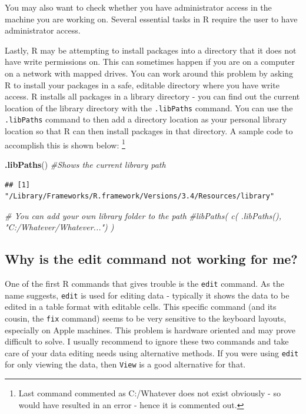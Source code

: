 \documentclass[]{krantz}
\makeatletter
\newenvironment{Shaded}{\begin{snugshade}}{\end{snugshade}}
\newcommand{\KeywordTok}[1]{\textcolor[rgb]{0.27,0.27,0.27}{\textbf{#1}}}
\newcommand{\CommentTok}[1]{\textcolor[rgb]{0.56,0.35,0.01}{\textit{#1}}}
\newcommand{\NormalTok}[1]{#1}
\newenvironment{kframe}{%
\medskip{}
\setlength{\fboxsep}{.8em}
 \def\at@end@of@kframe{}%
 \ifinner\ifhmode%
  \def\at@end@of@kframe{\end{minipage}}%
  \begin{minipage}{\columnwidth}%
 \fi\fi%
 \def\FrameCommand##1{\hskip\@totalleftmargin \hskip-\fboxsep
 \colorbox{shadecolor}{##1}\hskip-\fboxsep
     \hskip-\linewidth \hskip-\@totalleftmargin \hskip\columnwidth}%
 \MakeFramed {\advance\hsize-\width
   \@totalleftmargin\z@ \linewidth\hsize
   \@setminipage}}%
 {\par\unskip\endMakeFramed%
 \at@end@of@kframe}
\renewenvironment{Shaded}{\begin{kframe}}{\end{kframe}}
\theoremstyle{definition}
\theoremstyle{definition}
\theoremstyle{definition}
\theoremstyle{remark}
\makeatother
\begin{document}
You may also want to check whether you have administrator access in the
machine you are working on. Several essential tasks in R require the
user to have administrator access.

Lastly, R may be attempting to install packages into a directory that it
does not have write permissions on. This can sometimes happen if you are
on a computer on a network with mapped drives. You can work around this
problem by asking R to install your packages in a safe, editable
directory where you have write access. R installs all packages in a
library directory - you can find out the current location of the library
directory with the \texttt{.libPaths} command. You can use the
\texttt{.libPaths} command to then add a directory location as your
personal library location so that R can then install packages in that
directory. A sample code to accomplish this is shown below: \footnote{Last
  command commented as C:/Whatever does not exist obviously - so would
  have resulted in an error - hence it is commented out.}

\begin{Shaded}
\begin{Highlighting}[]
\KeywordTok{.libPaths}\NormalTok{() }\CommentTok{#Shows the current library path}
\end{Highlighting}
\end{Shaded}

\begin{verbatim}
## [1] "/Library/Frameworks/R.framework/Versions/3.4/Resources/library"
\end{verbatim}

\begin{Shaded}
\begin{Highlighting}[]
\CommentTok{# You can add your own library folder to the path}
\CommentTok{#libPaths( c( .libPaths(), "C:/Whatever/Whatever...") )}
\end{Highlighting}
\end{Shaded}

\subsection{Why is the edit command not working for
me?}\label{why-is-the-edit-command-not-working-for-me}

One of the first R commands that gives trouble is the \texttt{edit}
command. As the name suggests, \texttt{edit} is used for editing data -
typically it shows the data to be edited in a table format with editable
cells. This specific command (and its cousin, the \texttt{fix} command)
seems to be very sensitive to the keyboard layouts, especially on Apple
machines. This problem is hardware oriented and may prove difficult to
solve. I usually recommend to ignore these two commands and take care of
your data editing needs using alternative methods. If you were using
\texttt{edit} for only viewing the data, then \texttt{View} is a good
alternative for that.
\end{document}
